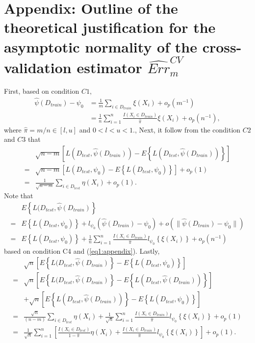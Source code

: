 \documentclass[12pt]{article}
\begin{document}
\section{Appendix: Outline of  the theoretical justification for the asymptotic normality of the cross-validation estimator $\widehat{Err}_m^{CV}$}
First, based on condition $C1,$
\begin{align}
\hat{\psi}(D_{train})-\psi_0&=\frac{1}{m}\sum_{i\in D_{train}} \xi(X_i)+o_p(m^{-1})\\
                            &=\frac{1}{n}\sum_{i=1}^n \frac{I(X_i\in D_{train})}{\hat{\pi}} \xi(X_i)+o_p(n^{-1}),
\label{eq1:appendix} \end{align}
where $\hat{\pi}=m/n\in [l, u]$ and $0<l<u<1.$, Next, it follow from the condition $C2$ and $C3$ that
\begin{align*}
&\sqrt{n-m}\left[L(D_{test}, \hat{\psi}(D_{train}))-E\left\{L(D_{test}, \hat{\psi}(D_{train}))\right\}\right]\\
=&\sqrt{n-m}[L(D_{test}, \psi_0)-E\left\{L(D_{test}, \psi_0)\right\}]+o_p(1)\\
=&\frac{1}{\sqrt{n-m}}\sum_{i \in D_{test}} \eta(X_i)+o_p(1). 
\end{align*}
Note that 
\begin{align*}
&E\left\{L(D_{test}, \hat{\psi}(D_{train})\right\}\\
=&E\left\{L(D_{test}, \psi_0)\right\}+l_{\psi_0}(\hat{\psi}(D_{train})-\psi_0)+o(\|\hat{\psi}(D_{train})-\psi_0\|)\\
=&E\left\{L(D_{test}, \psi_0)\right\}+\frac{1}{n}\sum_{i=1}^n \frac{I(X_i\in D_{train})}{\hat{\pi}} l_{\psi_0}\left\{\xi(X_i)\right\}+o_p(n^{-1})
\end{align*}
based on condition C4 and (\ref{eq1:appendix}). Lastly,
\begin{align*}
&\sqrt{n}\left[E\left\{L(D_{test}, \hat{\psi}(D_{train})\right\}-E\left\{L(D_{test}, \psi_0)\right\}\right]\\
=&\sqrt{n}\left[E\left\{L(D_{test}, \hat{\psi}(D_{train})\right\}-E\left\{L(D_{test}, \hat{\psi}(D_{train}))\right\}\right] \\
&+\sqrt{n}\left[E\left\{L(D_{test}, \hat{\psi}(D_{train}))\right\}-E\left\{L(D_{test}, \psi_0)\right\}\right]\\
=& \frac{\sqrt{n}}{(n-m)}\sum_{i \in D_{test}} \eta(X_i)+ \frac{1}{\sqrt{n}}\sum_{i=1}^n \frac{I(X_i\in D_{train})}{\hat{\pi}} l_{\psi_0}\left\{\xi(X_i)\right\}+    o_p(1)\\
=& \frac{1}{\sqrt{n}}\sum_{i=1}^n \left [ \frac{I(X_i\in D_{test})}{1-\hat{\pi}}\eta(X_i)+\frac{I(X_i\in D_{train})}{\hat{\pi}} l_{\psi_0}\left\{\xi(X_i)\right\}\right]+o_p(1).
\end{align*}
\end{document}
